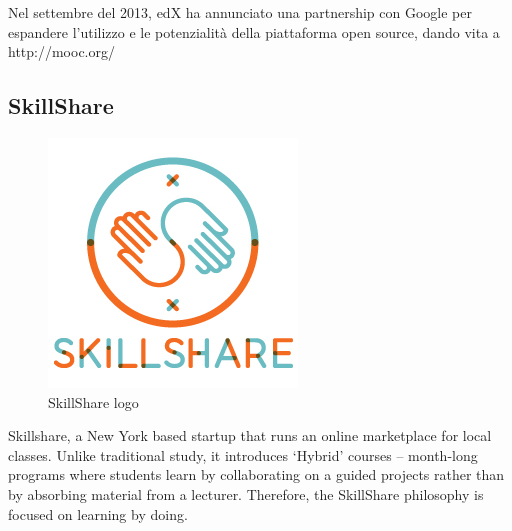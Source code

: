 Nel settembre del 2013, edX ha annunciato una partnership con Google per espandere l’utilizzo e le potenzialità della piattaforma open source, dando vita a http://mooc.org/






\subsection{SkillShare}
\label{subsec:SkillShare}
\begin{figure}[htb] %
 \centering
 \includegraphics[width=0.5\linewidth]{images/chapter1/skillshare.jpg}\hfill
 \caption[SkillShare logo]{SkillShare logo}
 \label{fig:fourV}
\end{figure}




Skillshare, a New York based startup that runs an online marketplace for local classes.
Unlike traditional study, it introduces ‘Hybrid’ courses – month-long programs where students learn by collaborating on a guided projects rather than by absorbing material from a lecturer. Therefore, the SkillShare philosophy is focused on learning by doing.

